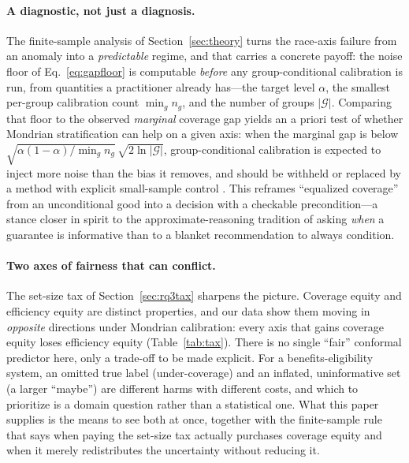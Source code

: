 \documentclass[review,12pt]{elsarticle}
\begin{document}
\paragraph{A diagnostic, not just a diagnosis.}
The finite-sample analysis of Section~\ref{sec:theory} turns the race-axis failure from an anomaly into a \emph{predictable} regime, and that carries a concrete payoff: the noise floor of Eq.~\eqref{eq:gapfloor} is computable \emph{before} any group-conditional calibration is run, from quantities a practitioner already has---the target level $\alpha$, the smallest per-group calibration count $\min_g n_g$, and the number of groups $|\mathcal{G}|$. Comparing that floor to the observed \emph{marginal} coverage gap yields an a priori test of whether Mondrian stratification can help on a given axis: when the marginal gap is below $\sqrt{\alpha(1-\alpha)/\min_g n_g}\,\sqrt{2\ln|\mathcal{G}|}$, group-conditional calibration is expected to inject more noise than the bias it removes, and should be withheld or replaced by a method with explicit small-sample control \cite{gibbs2023,jung2023}. This reframes ``equalized coverage'' from an unconditional good into a decision with a checkable precondition---a stance closer in spirit to the approximate-reasoning tradition of asking \emph{when} a guarantee is informative than to a blanket recommendation to always condition.

\paragraph{Two axes of fairness that can conflict.}
The set-size tax of Section~\ref{sec:rq3tax} sharpens the picture. Coverage equity and efficiency equity are distinct properties, and our data show them moving in \emph{opposite} directions under Mondrian calibration: every axis that gains coverage equity loses efficiency equity (Table~\ref{tab:tax}). There is no single ``fair'' conformal predictor here, only a trade-off to be made explicit. For a benefits-eligibility system, an omitted true label (under-coverage) and an inflated, uninformative set (a larger ``maybe'') are different harms with different costs, and which to prioritize is a domain question rather than a statistical one. What this paper supplies is the means to see both at once, together with the finite-sample rule that says when paying the set-size tax actually purchases coverage equity and when it merely redistributes the uncertainty without reducing it.
\end{document}
